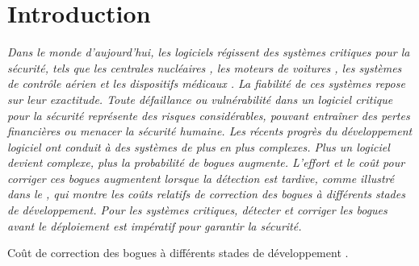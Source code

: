 \setcounter{sidenote}{0}

\chapter*{Introduction}

{\em
Dans le monde d'aujourd'hui, les logiciels régissent des systèmes critiques pour la sécurité, tels que les centrales nucléaires , les moteurs de voitures , les systèmes de contrôle aérien  et les dispositifs médicaux . La fiabilité de ces systèmes repose sur leur exactitude. Toute défaillance ou vulnérabilité dans un logiciel critique pour la sécurité représente des risques considérables, pouvant entraîner des pertes financières ou menacer la sécurité humaine. Les récents progrès du développement logiciel ont conduit à des systèmes de plus en plus complexes. Plus un logiciel devient complexe, plus la probabilité de bogues augmente. L'effort et le coût pour corriger ces bogues augmentent lorsque la détection est tardive, comme illustré dans le  , qui montre les coûts relatifs de correction des bogues à différents stades de développement. Pour les systèmes critiques, détecter et corriger les bogues avant le déploiement est impératif pour garantir la sécurité.
}

\begin{margintable}
  \caption{Coût de correction des bogues à différents stades de développement \cite{White2017}.}
  \centering
\end{margintable}

